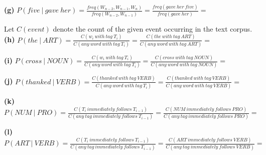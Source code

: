 \documentclass[11pt]{article}
\renewcommand\part[1]{\vspace{.10in}\textbf{(#1)}}
\begin{document}
\part{g} $P(five \ | \ gave \ her) = \frac{freq(W_{n-2}, W_{n-1}, W_n)}{freq(W_{n-2}, W_{n-1})} = \frac{freq(gave \ her \ five)}{freq(gave \ her)} = \ $

Let $C(event)$ denote the count of the given event occurring in the text corpus. \newline
\part{h} $P(the \ | \ ART) = \frac{C(w_i \ with \ tag \ T_i)}{C(any \ word \ with \ tag \ T_i)} = \frac{C(the \ with \ tag \ ART)}{C(any \ word \ with \ tag \ ART)} = \ $

\part{i} $P(cross \ | \ NOUN) = \frac{C(w_i \ with \ tag \ T_i)}{C(any \ word \ with \ tag \ T_i)} = \frac{C(cross \ with \ tag \ NOUN)}{C(any \ word \ with \ tag \ NOUN)} = \ $

\part{j} $P(thanked \ | \ VERB) = \frac{C(thanked \ with \ tag \ VERB)}{C(any \ word \ with \ tag \ T_i)} = \frac{C(thanked \ with \ tag \ VERB)}{C(any \ word \ with \ tag \ VERB)} = \ $

\part{k} $P(NUM \ | \ PRO) = \frac{C(T_i \ immediately \ follows \ T_{i-1})}{C(any \ tag \ immediately \ follows \ T_{i- 1})} = \frac{C(NUM \ immediately \ follows \ PRO)}{C(any \ tag \ immediately \ follows \ PRO)} = \ $

\part{l} $P(ART \ | \ VERB) = \frac{C(T_i \ immediately \ follows \ T_{i-1})}{C(any \ tag \ immediately \ follows \ T_{i- 1})} = \frac{C(ART \ immediately \ follows \ VERB)}{C(any \ tag \ immediately \ follows \ VERB)} = \ $
\end{document}

